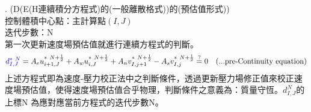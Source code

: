 \documentclass[12pt]{article}
\theoremstyle{upright}
\begin{document}
. \quad (D(E(H連續積分方程式)的(一般離散格式))的(預估值形式)) \\[0.5ex]
\noindent \quad 控制體積中心點：主計算點$(I,J)$\\
\noindent \quad 迭代步數：N\\
\noindent 第一次更新速度場預估值就進行連續方程式的判斷。
\begin{equation}\begin{split}
    {\color{blue}d_{I,J}^{*\ N}} = A_{e}u_{i+1,J}^{*\ N+\frac{1}{2}} + A_{w}u_{i,J}^{*\ N+\frac{1}{2}}+A_{n}v_{I,j+1}^{*\ N+\frac{1}{2}} -A_{s}v_{I,j}^{*\ N+\frac{1}{2}} \overset{?}{=} 0\quad \text{(...pre-Continuity equation)}
\end{split}\end{equation}
\noindent 上述方程式即為速度-壓力校正法中之判斷條件，透過更新壓力場修正值來校正速度場預估值，使得速度場預估值合乎物理，判斷條件之意義為：質量守恆。$d_{I,J}^{N}$的上標N 為應對應當前方程式的迭代步數N。
\end{document}
